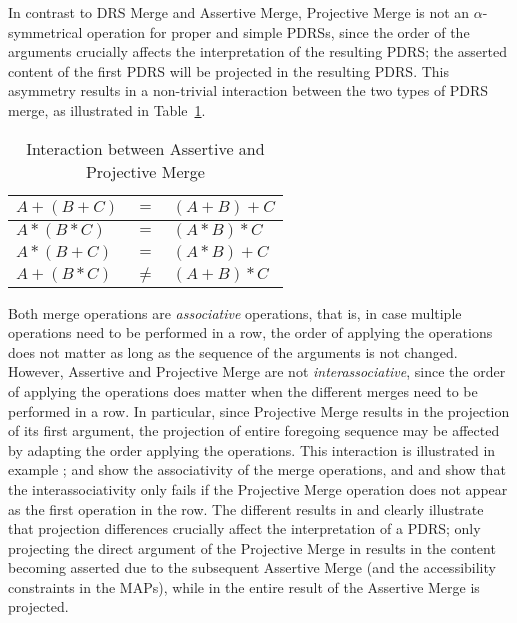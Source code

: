 \noindent In contrast to DRS Merge and Assertive Merge, Projective Merge is
not an $\alpha$-symmetrical operation for proper and simple PDRSs, since the
order of the arguments crucially affects the interpretation of the resulting
PDRS; the asserted content of the first PDRS will be projected in the
resulting PDRS. This asymmetry results in a non-trivial interaction between
the two types of PDRS merge, as illustrated in
Table~\ref{tab:mergeinteractions}.

\begin{table}[h]
  \caption{Interaction between Assertive and Projective Merge}
  \label{tab:mergeinteractions}
  \centering
  \begin{tabular}{| l c l |}
    \hline
    $A \plus (B \plus C)$ & $=$ & $(A \plus B) \plus C$\\
    \hline
    $A \ast (B \ast C)$ & $=$ & $(A \ast B) \ast C$\\
    \hline
    $A \ast (B \plus C)$ & $=$ & $(A \ast B) \plus C$\\
    \hline
    $A \plus (B \ast C)$ & $\neq$ & $(A \plus B) \ast C$\\
    \hline
  \end{tabular}
\end{table}

Both merge operations are \textit{associative} operations, that is, in case
multiple operations need to be performed in a row, the order of applying the
operations does not matter as long as the sequence of the arguments is not
changed. However, Assertive and Projective Merge are not
\textit{interassociative}, since the order of applying the operations does
matter when the different merges need to be performed in a row. In
particular, since Projective Merge results in the projection of its first
argument, the projection of entire foregoing sequence may be affected by
adapting the order applying the operations. This interaction is illustrated
in example \Next; \Next[a] and \Next[b] show the associativity of the merge
operations, and \Next[c] and \Next[d] show that the interassociativity only
fails if the Projective Merge operation does not appear as the first
operation in the row. The different results in \Next[d.i] and \Next[d.ii]
clearly illustrate that projection differences crucially affect the
interpretation of a PDRS; only projecting the direct argument of the
Projective Merge in \Next[d.i] results in the content becoming asserted due
to the subsequent Assertive Merge (and the accessibility constraints in the
MAPs), while in \Next[d.ii] the entire result of the Assertive Merge is
projected.

